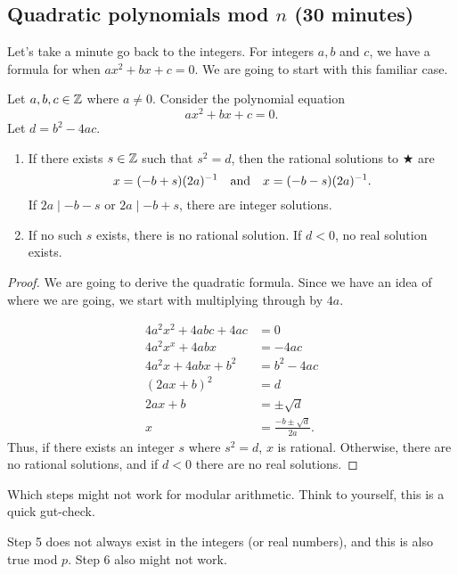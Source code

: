 \documentclass[letterpaper, 11 pt]{article}
\begin{document}
\subsection{Quadratic polynomials mod $n$ (30 minutes)}
Let's take a minute go back to the integers. For integers $a,b$ and $c$, we have a formula for when $ax^2+bx+c=0$. We are going to start with this familiar case.

\begin{thm}
 Let $a,b,c\in\mathbb Z$ where $a\neq 0$. Consider the polynomial equation \[ax^2+bx+c=0.\tag{$\bigstar$}\] Let $d=b^2-4ac$. 
\begin{enumerate}
 \item If there exists $s\in\mathbb Z$ such that $s^2=d$, then the rational solutions to $\bigstar$ are \[x=(-b+s)(2a)^{-1}\quad\textnormal{and}\quad x=(-b-s)(2a)^{-1}.\] If $2a\mid -b-s$ or $2a\mid -b+s$, there are integer solutions.
 \item If no such $s$ exists, there is no rational solution. If $d<0$, no real solution exists.
\end{enumerate}
\end{thm}
\begin{proof}
 We are going to derive the quadratic formula. Since we have an idea of where we are going, we start with multiplying through by $4a$.
 
\begin{align}
 4a^2x^2+4abc+4ac&=0\\
 4a^2x^x+4abx&=-4ac\\
 4a^2x+4abx+b^2&=b^2-4ac\\
 (2ax+b)^2&=d\\
 2ax+b&=\pm\sqrt{d}\\
 x&=\frac{-b\pm\sqrt{d}}{2a}.
\end{align}
Thus, if there exists an integer $s$ where $s^2=d$, $x$ is rational. Otherwise, there are no rational solutions, and if $d<0$ there are no real solutions.
\end{proof}

\begin{poll}
Which steps might not work for modular arithmetic. Think to yourself, this is a quick gut-check.
\end{poll}
\begin{solution}
 Step 5 does not always exist in the integers (or real numbers), and this is also true mod $p$. Step 6 also might not work.
\end{solution}
\end{document}
